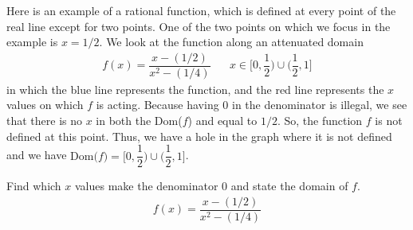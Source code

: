\begin{example}
Here is an example of a rational function, which is defined at every point of the real line except for two points. One of the two points on which we focus in the example is $x=1/2$. We look at the function along an attenuated domain
\begin{align*}
    f(x) = \dfrac{x - (1/2)}{x^{2} - (1/4)} \hspace{20pt} x \in \Big[0, \dfrac{1}{2}\Big) \cup \Big(\dfrac{1}{2}, 1\Big]
\end{align*}
in which the blue line represents the function, and the red line represents the $x$ values on which $f$ is acting. Because having $0$ in the denominator is illegal, we see that there is no $x$ in both the Dom($f$) and equal to $1/2$. So, the function $f$ is not defined at this point. Thus, we have a hole in the graph where it is not defined and we have $\text{Dom($f$)}=\Big[0, \dfrac{1}{2}\Big) \cup \Big(\dfrac{1}{2}, 1\Big]$.

\vspace{0.5in}
\end{example}

\begin{exercise}
Find which $x$ values make the denominator $0$ and state the domain of $f$.
\begin{align*}
    f(x) = \dfrac{x-(1/2)}{x^{2}-(1/4)}
\end{align*}
\end{exercise}